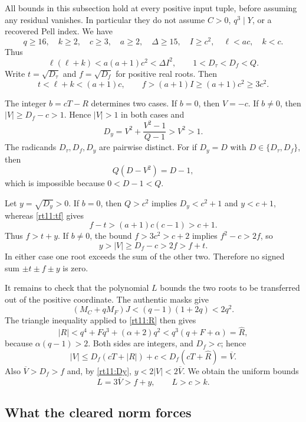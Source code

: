 All bounds in this subsection hold at every positive input tuple, before
assuming any residual vanishes. In particular they do not assume $C>0$,
$q^3\mid Y$, or a recovered Pell index. We have
\[
 q\ge16,\quad k\ge2,\quad c\ge3,\quad a\ge2,\quad
 \Delta\ge15,\quad I\ge c^2,\quad \ell<ac,\quad k<c.
\]
Thus
\[
 \ell(\ell+k)<a(a+1)c^2<\Delta I^2,
 \qquad 1<D_\tau<D_f<Q.
\]
Write $t=\sqrt{D_\tau}$ and $f=\sqrt{D_f}$ for positive real roots.
Then
\begin{equation}
 t<\ell+k<(a+1)c,
 \qquad f>(a+1)I\ge(a+1)c^2\ge3c^2.
 \label{rt11:tf}
\end{equation}

The integer $b=cT-R$ determines two cases. If $b=0$, then $V=-c$.
If $b\ne0$, then $|V|\ge D_f-c>1$. Hence $|V|>1$ in both cases and
\begin{equation}
 D_y=V^2+\frac{V^2-1}{Q-1}>V^2>1.
 \label{rt11:Dy}
\end{equation}
The radicands $D_\tau,D_f,D_y$ are pairwise distinct. For if
$D_y=D$ with $D\in\{D_\tau,D_f\}$, then
\[
 Q(D-V^2)=D-1,
\]
which is impossible because $0<D-1<Q$.

Let $y=\sqrt{D_y}>0$. If $b=0$, then $Q>c^2$ implies
$D_y<c^2+1$ and $y<c+1$, whereas \eqref{rt11:tf} gives
\[
 f-t>(a+1)c(c-1)>c+1.
\]
Thus $f>t+y$. If $b\ne0$, the bound $f>3c^2>c+2$ implies
$f^2-c>2f$, so
\[
 y>|V|\ge D_f-c>2f>f+t.
\]
In either case one root exceeds the sum of the other two. Therefore no
signed sum $\pm t\pm f\pm y$ is zero.

It remains to check that the polynomial $L$ bounds the two roots to be
transferred out of the positive coordinate. The authentic masks give
\[
 (M_C+qM_F)J<(q-1)(1+2q)<2q^2.
\]
The triangle inequality applied to \eqref{rt11:R} then gives
\[
 |R|<q^4+Fq^3+(\alpha+2)q^2
     <q^3(q+F+\alpha)=\widehat R,
\]
because $\alpha(q-1)>2$. Both sides are integers, and $D_f>c$; hence
\[
 |V|\le D_f(cT+|R|)+c
       <D_f(cT+\widehat R)=\overline V.
\]
Also $\overline V>D_f>f$ and, by \eqref{rt11:Dy},
$y<2|V|<2\overline V$. We obtain the uniform bounds
\begin{equation}
 L=3\overline V>f+y,
 \qquad L>c>k.
 \label{rt11:Lbound}
\end{equation}

\subsection{What the cleared norm forces}

